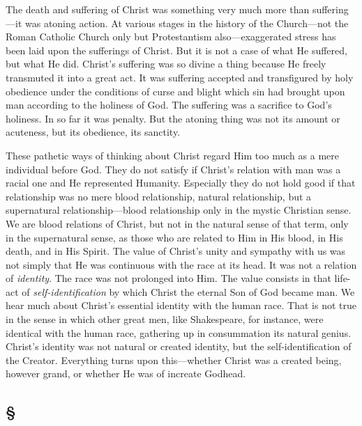 \documentclass[draft]{ptfdoc}
\begin{document}
The death and suffering of Christ was something 
very much more than suffering---it was 
atoning action. At various stages in the history 
of the Church---not the Roman Catholic Church 
only but Protestantism also---exaggerated stress 
has been laid upon the sufferings of Christ. 
But it is not a case of what He suffered, but 
what He did. Christ's suffering was so divine 
a thing because He freely transmuted it into a 
great act. It was suffering accepted and transfigured 
by holy obedience under the conditions 
of curse and blight which sin had brought upon 
man according to the holiness of God. The 
suffering was a sacrifice to God's holiness. In 
so far it was penalty. But the atoning thing 
was not its amount or acuteness, but its 
obedience, its sanctity. 


These pathetic ways of thinking about Christ 
regard Him too much as a mere individual 
before God. They do not satisfy if Christ's 
relation with man was a racial one and He 
represented Humanity. Especially they do not 
hold good if that relationship was no mere 
blood relationship, natural relationship, but a 
supernatural relationship---blood relationship 
only in the mystic Christian sense. We are 
blood relations of Christ, but not in the natural 
sense of that term, only in the supernatural 
sense, as those who are related to Him in His 
blood, in His death, and in His Spirit. The 
value of Christ's unity and sympathy with us 
was not simply that He was continuous with 
the race at its head. It was not a relation 
of \textit{identity}. The race was not prolonged into 
Him. The value consists in that life-act of \textit{self-identification} 
by which Christ the eternal Son of 
God became man. We hear much about Christ's 
essential identity with the human race. That is 
not true in the sense in which other great men, 
like Shakespeare, for instance, were identical 
with the human race, gathering up in consummation 
its natural genius. Christ's identity was 
not natural or created identity, but the self-identification 
of the Creator. Everything turns 
upon this---whether Christ was a created being, 
however grand, or whether He was of increate 
Godhead. 

\subsection*{
\S
}
\end{document}
